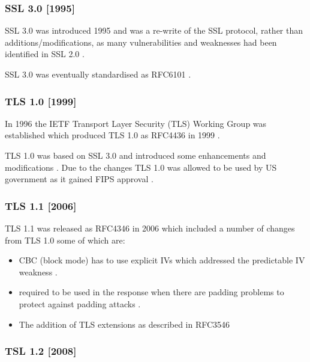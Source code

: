 \documentclass{mscreport}
\begin{document}
\subsubsection{SSL 3.0 [1995]}

SSL 3.0 was introduced 1995 \cite{Ristic2017-aj,Oppliger2016-ig} and was a re-write of the SSL protocol, rather than additions/modifications, as many vulnerabilities and weaknesses had been identified in SSL 2.0 \cite{Ristic2017-aj,Wagner1996-fx}.

\vspace{0.3cm}
\noindent SSL 3.0 was eventually standardised as RFC6101 \cite{Freier2011-pt}.

\subsubsection{TLS 1.0 [1999]}

In 1996 the IETF Transport Layer Security (TLS) Working Group was established \cite{Oppliger2016-ig,Farrell2010-kv} which produced TLS 1.0 as RFC4436 in 1999 \cite{Dierks1999-fn}.

\vspace{0.3cm}
\noindent TLS 1.0 was based on SSL 3.0 and introduced some enhancements and modifications \cite{Rescorla2001-gg}. Due to the changes TLS 1.0 was allowed to be used by US government as it gained FIPS approval \cite{Ristic2017-aj}.

\subsubsection{TLS 1.1 [2006]}

TLS 1.1 was released as RFC4346 in 2006 \cite{Dierks2006-wu} which included a number of changes from TLS 1.0 some of which are:
\begin{itemize}
	\setlength\itemsep{0.1em}
	\item CBC (block mode) has to use explicit IVs which addressed the predictable IV weakness \cite{Ristic2017-aj}.
	\item \texttt{} required to be used in the response when there are padding problems to protect against padding attacks \cite{Ristic2017-aj}.
	\item The addition of TLS extensions \cite{Ristic2017-aj} as described in RFC3546 \cite{Blake-Wilson2003-qv}
\end{itemize}

\subsubsection{TSL 1.2 [2008]}
\end{document}

